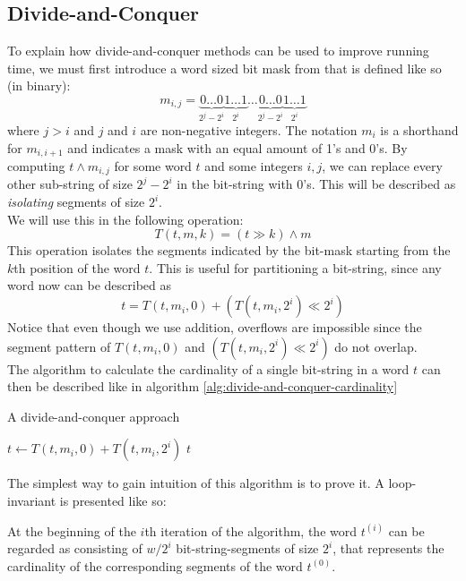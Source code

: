 \subsection{Divide-and-Conquer}
To explain how divide-and-conquer methods can be used to improve running time, we must first introduce a word sized bit mask from \cite{fast-similarity-search} that is defined like so (in binary):
$$m_{i,j} = \underbrace{0\dots 0}_{2^{j}-2^{i}}\underbrace{1\dots 1}_{2^i}\dots\underbrace{0\dots 0}_{2^{j}-2^{i}}\underbrace{1\dots 1}_{2^i}$$
where $j > i$ and $j$ and $i$ are non-negative integers. The notation $m_{i}$ is a shorthand for $m_{i, i+1}$ and indicates a mask with an equal amount of 1's and 0's. By computing $t \land m_{i,j}$ for some word $t$ and some integers $i, j$, we can replace every other sub-string of size $2^j-2^i$ in the bit-string with 0's. This will be described as \textit{isolating} segments of size $2^i$.\\
We will use this in the following operation:
\begin{equation}
    T(t, m, k) = (t\gg k) \land m
\end{equation}
This operation isolates the segments indicated by the bit-mask starting from the $k$th position of the word $t$. This is useful for partitioning a bit-string, since any word now can be described as
$$t=T(t, m_i, 0) + (T(t, m_i, 2^i) \ll 2^i)$$
Notice that even though we use addition, overflows are impossible since the segment pattern of $T(t, m_i, 0)$ and $(T(t, m_i, 2^i) \ll 2^i)$ do not overlap.\\
The algorithm to calculate the cardinality of a single bit-string in a word $t$ can then be described like in algorithm \ref{alg:divide-and-conquer-cardinality}
\begin{algorithm}[H]
\caption{A divide-and-conquer approach}\label{alg:divide-and-conquer-cardinality}
\begin{algorithmic}[1]
\State $t \gets T(t, m_i, 0) + T(t, m_i, 2^i)$
\EndFor
\State \Return $t$
\EndFunction
\end{algorithmic}
\end{algorithm}
The simplest way to gain intuition of this algorithm is to prove it. A loop-invariant is presented like so:
\begin{invariant}
\label{thm:divide-invariant}
At the beginning of the $i$th iteration of the algorithm, the word $t^{(i)}$ can be regarded as consisting of $w/2^i$ bit-string-segments of size $2^i$, that represents the cardinality of the corresponding segments of the word $t^{(0)}$.
\end{invariant}
